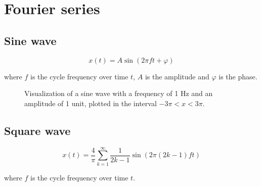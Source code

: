 \documentclass[11pt]{article}
\begin{document}
\section{Fourier series}

\subsection{Sine wave}

\begin{equation}
    x(t) = A\sin(2\pi ft + \varphi)
    \label{eq:si_wave}
\end{equation}

where $f$ is the cycle frequency over time $t$, $A$ is the amplitude and $\varphi$ is the phase.

\begin{figure}[H]
    \centering
    \caption{Visualization of a sine wave with a frequency of 1 Hz and an amplitude of 1 unit, plotted in the interval $-3\pi < x < 3\pi$.}
    \label{fig:si_wave}
\end{figure}

\subsection{Square wave}

\begin{equation}
    x(t) = \frac{4}{\pi}\sum_{k = 1}^{\infty}\frac{1}{2k - 1}\sin(2\pi(2k - 1)ft)
    \label{eq:sq_wave}
\end{equation}

where $f$ is the cycle frequency over time $t$.\cite{wiki:sq_wave}
\end{document}
